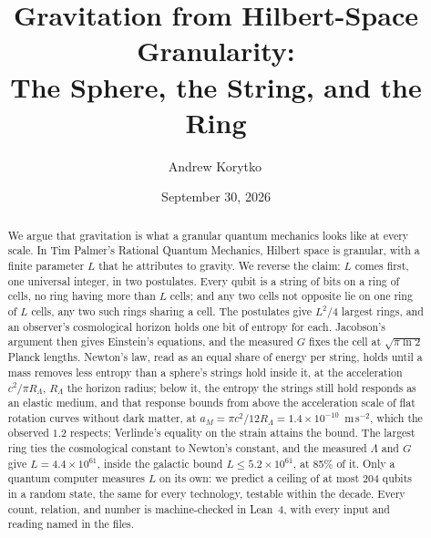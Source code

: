 \documentclass[aps,prd,twocolumn,superscriptaddress,nofootinbib,showkeys]{revtex4-2}
\newcommand{\RL}{R_\Lambda}
\begin{document}
\title{Gravitation from Hilbert-Space Granularity:\\ The Sphere, the String, and the Ring}

\author{Andrew Korytko\,}

\date{September 30, 2026}

\begin{abstract}
We argue that gravitation is what a granular quantum mechanics looks like at every scale. In Tim Palmer's Rational Quantum Mechanics, Hilbert space is granular, with a finite parameter $L$ that he attributes to gravity. We reverse the claim: $L$ comes first, one universal integer, in two postulates. Every qubit is a string of bits on a ring of cells, no ring having more than $L$ cells; and any two cells not opposite lie on one ring of $L$ cells, any two such rings sharing a cell. The postulates give $L^2/4$ largest rings, and an observer's cosmological horizon holds one bit of entropy for each. Jacobson's argument then gives Einstein's equations, and the measured $G$ fixes the cell at $\sqrt{\pi\ln2}$ Planck lengths. Newton's law, read as an equal share of energy per string, holds until a mass removes less entropy than a sphere's strings hold inside it, at the acceleration $c^2/\pi\RL$, $\RL$ the horizon radius; below it, the entropy the strings still hold responds as an elastic medium, and that response bounds from above the acceleration scale of flat rotation curves without dark matter, at $a_M = \pi c^2/12\RL = 1.4\times10^{-10}$~m\,s$^{-2}$, which the observed $1.2$ respects; Verlinde's equality on the strain attains the bound. The largest ring ties the cosmological constant to Newton's constant, and the measured $\Lambda$ and $G$ give $L = 4.4\times10^{61}$, inside the galactic bound $L \le 5.2\times10^{61}$, at 85\% of it. Only a quantum computer measures $L$ on its own: we predict a ceiling of at most $204$ qubits in a random state, the same for every technology, testable within the decade. Every count, relation, and number is machine-checked in Lean~4, with every input and reading named in the files.
\end{abstract}


\maketitle
\end{document}
